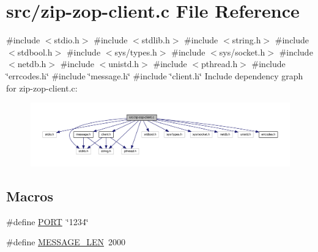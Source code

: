 \hypertarget{zip-zop-client_8c}{}\section{src/zip-\/zop-\/client.c File Reference}
\label{zip-zop-client_8c}
{\ttfamily \#include $<$stdio.\+h$>$}\newline
{\ttfamily \#include $<$stdlib.\+h$>$}\newline
{\ttfamily \#include $<$string.\+h$>$}\newline
{\ttfamily \#include $<$stdbool.\+h$>$}\newline
{\ttfamily \#include $<$sys/types.\+h$>$}\newline
{\ttfamily \#include $<$sys/socket.\+h$>$}\newline
{\ttfamily \#include $<$netdb.\+h$>$}\newline
{\ttfamily \#include $<$unistd.\+h$>$}\newline
{\ttfamily \#include $<$pthread.\+h$>$}\newline
{\ttfamily \#include \char`\"{}errcodes.\+h\char`\"{}}\newline
{\ttfamily \#include \char`\"{}message.\+h\char`\"{}}\newline
{\ttfamily \#include \char`\"{}client.\+h\char`\"{}}\newline
Include dependency graph for zip-\/zop-\/client.c\+:\nopagebreak
\begin{figure}[H]
\begin{center}
\leavevmode
\includegraphics[width=350pt]{zip-zop-client_8c__incl}
\end{center}
\end{figure}
\subsection*{Macros}
\begin{DoxyCompactItemize}
\item 
\#define \hyperlink{zip-zop-client_8c_a614217d263be1fb1a5f76e2ff7be19a2}{P\+O\+RT}~\char`\"{}1234\char`\"{}
\item 
\#define \hyperlink{zip-zop-client_8c_aa2dfc63100e2bed7efb1b0cd09dea107}{M\+E\+S\+S\+A\+G\+E\+\_\+\+L\+EN}~2000
\end{DoxyCompactItemize}
